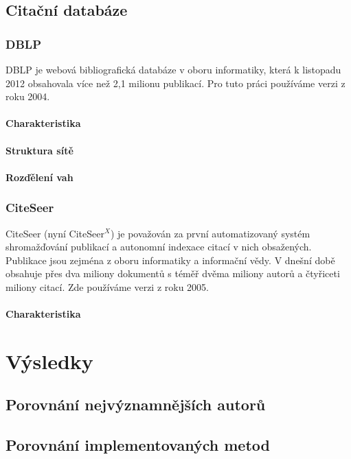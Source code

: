 \documentclass[12pt,titlepage]{report}
\begin{document}
\section{Citační databáze}
\subsection{DBLP}
DBLP \cite{DBLP} je webová bibliografická databáze v oboru informatiky,
která k listopadu 2012 obsahovala více než 2,1 milionu publikací. Pro tuto
práci používáme verzi z roku 2004.

\subsubsection{Charakteristika}
\subsubsection{Struktura sítě}
\subsubsection{Rozďělení vah}

\subsection{CiteSeer}
CiteSeer (nyní CiteSeer$^X$) \cite{citeseer} je považován za první
automatizovaný systém shromažďování publikací a autonomní indexace citací v
nich obsažených. Publikace jsou zejména z oboru informatiky a informační vědy.
V dnešní době obsahuje přes dva miliony dokumentů s téměř dvěma miliony autorů
a čtyřiceti miliony citací. Zde používáme verzi z roku 2005.

\subsubsection{Charakteristika}


\chapter{Výsledky}
\section{Porovnání nejvýznamnějších autorů}
\section{Porovnání implementovaných metod}
\end{document}
